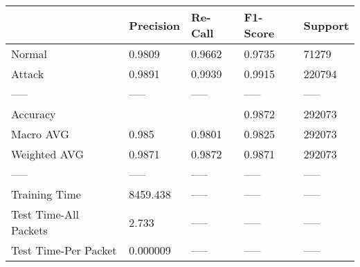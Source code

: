 \begin{tabular}{lllll}
\toprule
{} & Precision & Re-Call & F1-Score & Support \\
\midrule
Normal                &    0.9809 &  0.9662 &   0.9735 &   71279 \\
Attack                &    0.9891 &  0.9939 &   0.9915 &  220794 \\
-----                 &     ----- &   ----- &    ----- &   ----- \\
Accuracy              &           &         &   0.9872 &  292073 \\
Macro AVG             &     0.985 &  0.9801 &   0.9825 &  292073 \\
Weighted AVG          &    0.9871 &  0.9872 &   0.9871 &  292073 \\
-----                 &     ----- &   ----- &    ----- &   ----- \\
Training Time         &  8459.438 &   ----- &    ----- &   ----- \\
Test Time-All Packets &     2.733 &   ----- &    ----- &   ----- \\
Test Time-Per Packet  &  0.000009 &   ----- &    ----- &   ----- \\
\bottomrule
\end{tabular}
